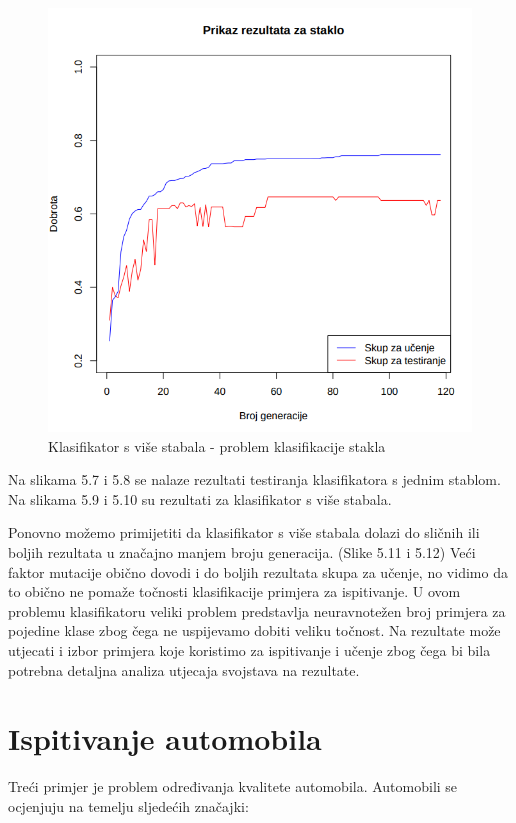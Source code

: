 \documentclass[times, utf8, zavrsni]{fer}
\begin{document}
\begin{figure}[htb]
\centering
\includegraphics[scale=0.45]{grafovi/staklo2-3}
\caption{Klasifikator s više stabala - problem klasifikacije stakla}
\end{figure}

Na slikama 5.7 i 5.8 se nalaze rezultati testiranja klasifikatora s jednim stablom. Na slikama 5.9 i 5.10 su rezultati za klasifikator s više stabala.

Ponovno možemo primijetiti da klasifikator s više stabala dolazi do sličnih ili boljih rezultata u značajno manjem broju generacija. (Slike 5.11 i 5.12) Veći faktor mutacije obično dovodi i do boljih rezultata skupa za učenje, no vidimo da to obično ne pomaže točnosti klasifikacije primjera za ispitivanje. U ovom problemu klasifikatoru veliki problem predstavlja neuravnotežen broj primjera za pojedine klase zbog čega ne uspijevamo dobiti veliku točnost. Na rezultate može utjecati i izbor primjera koje koristimo za ispitivanje i učenje zbog čega bi bila potrebna detaljna analiza utjecaja svojstava na rezultate.


\section{Ispitivanje automobila}

Treći primjer je problem određivanja kvalitete automobila. Automobili se ocjenjuju na temelju sljedećih značajki:
\end{document}

